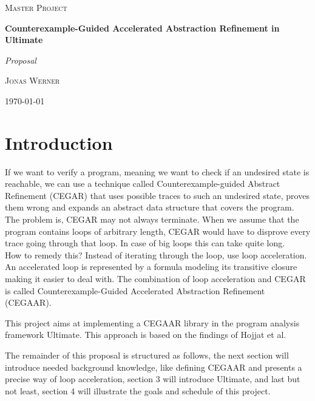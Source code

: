 \documentclass{article}
\begin{document}
	\newcommand{\HorizontalLine}{\rule{\linewidth}{0.3mm}}
	
		\begin{center}
		{\scshape\Large Master Project \par}
		\vspace{1.5cm}
		{\huge\bfseries Counterexample-Guided Accelerated Abstraction Refinement in Ultimate \par}
		{\Huge\itshape Proposal \par}
		\vspace{1cm}
		{\large \scshape Jonas Werner\par}
		\vspace{0.5cm}
		{\today \vspace{2cm}} 
		
		\end{center}

\section{Introduction}
If we want to verify a program, meaning we want to check if an undesired state is reachable, we can use a technique called Counterexample-guided Abstract Refinement (CEGAR) that uses possible traces to such an undesired state, proves them wrong and expands an abstract data structure that covers the program. \\
The problem is, CEGAR may not always terminate. When we assume that the program contains loops of arbitrary length, CEGAR would have to disprove every trace going through that loop. In case of big loops this can take quite long. \\
How to remedy this? Instead of iterating through the loop, use loop acceleration. An accelerated loop is represented by a formula modeling its transitive closure making it easier to deal with. The combination of loop acceleration and CEGAR is called Counterexample-Guided Accelerated Abstraction Refinement (CEGAAR). \\ \par
This project aims at implementing a CEGAAR library in the program analysis framework Ultimate. This approach is based on the findings of Hojjat et al. \\ \par
The remainder of this proposal is structured as follows, the next section will introduce needed background knowledge, like defining CEGAAR and presents a precise way of loop acceleration, section 3 will introduce Ultimate, and last but not least, section 4 will illustrate the goals and schedule of this project.
\end{document}
